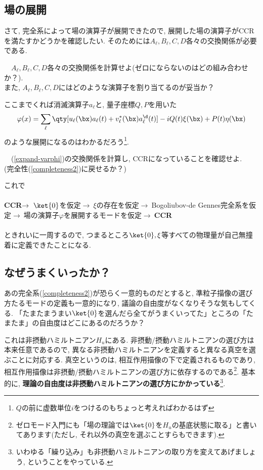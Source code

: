 \documentclass[10.5pt,a4paper]{jreport}
\begin{document}
\subsection{場の展開}
さて, 完全系によって場の演算子が展開できたので, 展開した場の演算子がCCRを満たすかどうかを確認したい. そのためには$A_\ell, B_\ell, C, D$各々の交換関係が必要である. 
\begin{screen}
  \ \ $A_\ell, B_\ell, C, D$各々の交換関係を計算せよ(ゼロにならないのはどの組み合わせか？). \\
  また, $A_\ell, B_\ell, C, D$にはどのような演算子を割り当てるのが妥当か？
\end{screen}
ここまでくれば消滅演算子$a_\ell$と, 量子座標$Q, P$を用いた
\begin{eqnarray}
  \varphi(x) = \sum_\ell \qty[u_\ell(\bx) a_\ell(t) + v^*_\ell(\bx) a^\d_\ell(t)]  -iQ(t)\xi(\bx) + P(t)\eta(\bx)\label{expand-varphi}
\end{eqnarray}
のような展開になるのはわかるだろう\footnote{$Q$の前に虚数単位$i$をつけるのもちょっと考えればわかるはず}.
\begin{screen}
  \ \ (\ref{expand-varphi})の交換関係を計算し, CCRになっていることを確認せよ. \\
  (完全性(\ref{completeness2})に戻せるか？)
\end{screen}
これで
\\\\
\textbf{CCR}$\rightarrow\ \ket{0}$を仮定$\rightarrow\ \xi$の存在を仮定$\rightarrow\ $Bogoliubov-de Gennes完全系を仮定$\rightarrow\ $場の演算子$\varphi$を展開するモードを仮定$\rightarrow\ $\textbf{CCR}
\\\\
ときれいに一周するので, つまるところ$\ket{0}, \xi$等すべての物理量が自己無撞着に定義できたことになる.
\subsection{なぜうまくいったか？}
あの完全系(\ref{completeness2})が恐らく一意的ものだとすると, 準粒子描像の選び方たるモードの定義も一意的になり, 議論の自由度がなくなりそうな気もしてくる. 「たまたまうまい$\ket{0}$を選んだら全てがうまくいってた」ところの「たまたま」の自由度はどこにあるのだろうか？

これは非摂動ハミルトニアン$H_u$にある. 非摂動/摂動ハミルトニアンの選び方は本来任意であるので, 異なる非摂動ハミルトニアンを定義すると異なる真空を選ぶことに対応する. 真空というのは, 相互作用描像の下で定義されるものであり, 相互作用描像は非摂動/摂動ハミルトニアンの選び方に依存するのである\footnote{ゼロモード入門にも「場の理論では$\ket{0}$を$H_u$の基底状態に取る」と書いてあります(ただし, それ以外の真空を選ぶことすらもできます). }. 基本的に, \textbf{理論の自由度は非摂動ハミルトニアンの選び方にかかっている}\footnote{いわゆる「繰り込み」も非摂動ハミルトニアンの取り方を変えてあげましょう, ということをやっている. }.
\end{document}
